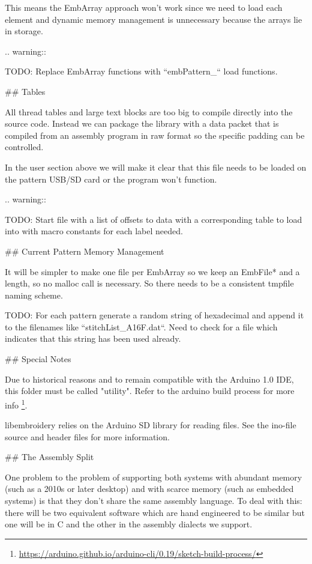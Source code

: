 This means the EmbArray approach won't work since we need to load
each element and dynamic memory management is unnecessary because
the arrays lie in storage.

.. warning::

   TODO: Replace EmbArray functions with ``embPattern\_`` load functions.

## Tables

All thread tables and large text blocks are too big to compile directly
into the source code. Instead we can package the library with a data packet
that is compiled from an assembly program in raw format so the specific
padding can be controlled.

In the user section above we will make it clear that this file
needs to be loaded on the pattern USB/SD card or the program won't function.

.. warning::

   TODO: Start file with a list of offsets to data with a corresponding table
   to load into with macro constants for each label needed.

## Current Pattern Memory Management

It will be simpler to make one file per EmbArray so we keep an EmbFile*
and a length, so no malloc call is necessary. So there needs to be a consistent
tmpfile naming scheme.

TODO: For each pattern generate a random string of hexadecimal and append it
to the filenames like ``stitchList\_A16F.dat``. Need to check for a file
which indicates that this string has been used already.

## Special Notes

Due to historical reasons and to remain compatible with the Arduino 1.0
IDE, this folder must be called "utility". Refer to the arduino build
process for more info
\footnote{\url{https://arduino.github.io/arduino-cli/0.19/sketch-build-process/}}.

libembroidery relies on the Arduino SD library for reading files. See
the ino-file source and header files for more information.

## The Assembly Split

One problem to the problem of supporting both systems with abundant memory
(such as a 2010s or later desktop) and with scarce memory (such as embedded
systems) is that they don't share the same assembly language. To deal with
this: there will be two equivalent software which are hand engineered to be
similar but one will be in C and the other in the assembly dialects we support.

